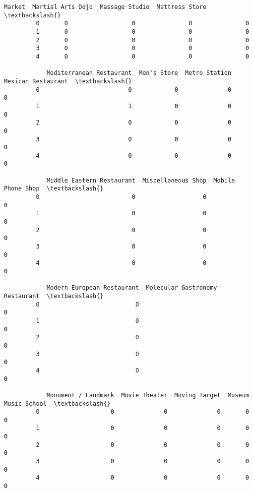 \documentclass[11pt]{article}
\begin{document}
\begin{Verbatim}[commandchars=\\\{\}]
            Market  Martial Arts Dojo  Massage Studio  Mattress Store  \textbackslash{}
         0       0                  0               0               0   
         1       0                  0               0               0   
         2       0                  0               0               0   
         3       0                  0               0               0   
         4       0                  0               0               0   
         
            Mediterranean Restaurant  Men's Store  Metro Station  Mexican Restaurant  \textbackslash{}
         0                         0            0              0                   0   
         1                         1            0              0                   0   
         2                         0            0              0                   0   
         3                         0            0              0                   0   
         4                         0            0              0                   0   
         
            Middle Eastern Restaurant  Miscellaneous Shop  Mobile Phone Shop  \textbackslash{}
         0                          0                   0                  0   
         1                          0                   0                  0   
         2                          0                   0                  0   
         3                          0                   0                  0   
         4                          0                   0                  0   
         
            Modern European Restaurant  Molecular Gastronomy Restaurant  \textbackslash{}
         0                           0                                0   
         1                           0                                0   
         2                           0                                0   
         3                           0                                0   
         4                           0                                0   
         
            Monument / Landmark  Movie Theater  Moving Target  Museum  Music School  \textbackslash{}
         0                    0              0              0       0             0   
         1                    0              0              0       0             0   
         2                    0              0              0       0             0   
         3                    0              0              0       0             0   
         4                    0              0              0       0             0   
         

\end{Verbatim}
\end{document}

